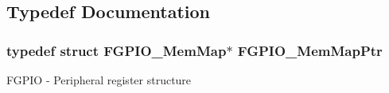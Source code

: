 \subsection{Typedef Documentation}
\hypertarget{group___f_g_p_i_o___peripheral_gaeed3beeb5e5c99ae5b0e404b21466e55}{}
\subsubsection[{F\+G\+P\+I\+O\+\_\+\+Mem\+Map\+Ptr}]{\setlength{\rightskip}{0pt plus 5cm}typedef struct {\bf F\+G\+P\+I\+O\+\_\+\+Mem\+Map}$\ast$ {\bf F\+G\+P\+I\+O\+\_\+\+Mem\+Map\+Ptr}}\label{group___f_g_p_i_o___peripheral_gaeed3beeb5e5c99ae5b0e404b21466e55}
F\+G\+P\+I\+O -\/ Peripheral register structure 